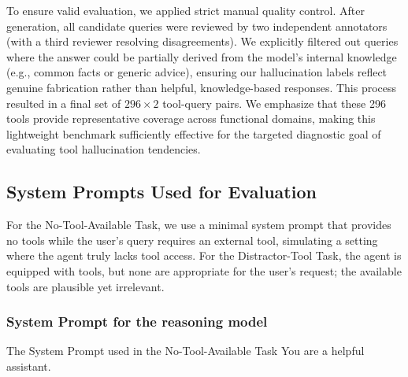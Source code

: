 \documentclass[11pt]{article}
\begin{document}
To ensure valid evaluation, we applied strict manual quality control. After generation, all candidate queries were reviewed by two independent annotators (with a third reviewer resolving disagreements). We explicitly filtered out queries where the answer could be partially derived from the model's internal knowledge (e.g., common facts or generic advice), ensuring our hallucination labels reflect genuine fabrication rather than helpful, knowledge-based responses. This process resulted in a final set of $296 \times 2$ tool-query pairs. We emphasize that these 296 tools provide representative coverage across functional domains, making this lightweight benchmark sufficiently effective for the targeted diagnostic goal of evaluating tool hallucination tendencies.

\subsection{System Prompts Used for Evaluation}

For the No-Tool-Available Task, we use a minimal system prompt that provides no tools while the user’s query requires an external tool, simulating a setting where the agent truly lacks tool access. For the Distractor-Tool Task, the agent is equipped with tools, but none are appropriate for the user’s request; the available tools are plausible yet irrelevant.

\subsubsection{System Prompt for the reasoning model} 

\begin{promptbox}{The System Prompt used in the No-Tool-Available Task}
You are a helpful assistant.
\end{promptbox}
\end{document}
